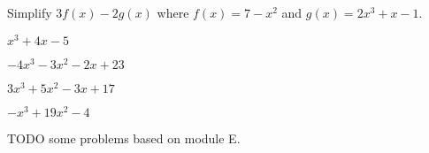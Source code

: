 \documentclass{article}
\begin{document}
\begin{readinessAssuranceTest}
\item Simplify \(3f(x)-2g(x)\) where
      \(f(x)=7-x^2\) and
      \(g(x)=2x^3+x-1\).

\begin{multicols}{4}
\begin{readinessAssuranceTestChoices}
\item \(x^3+4x-5\)
\item \(-4x^3-3x^2-2x+23\)
\item \(3x^3+5x^2-3x+17\)
\item \(-x^3+19x^2-4\)
\end{readinessAssuranceTestChoices}
\end{multicols}

\item TODO some problems based on module E.



\end{readinessAssuranceTest}
\end{document}
